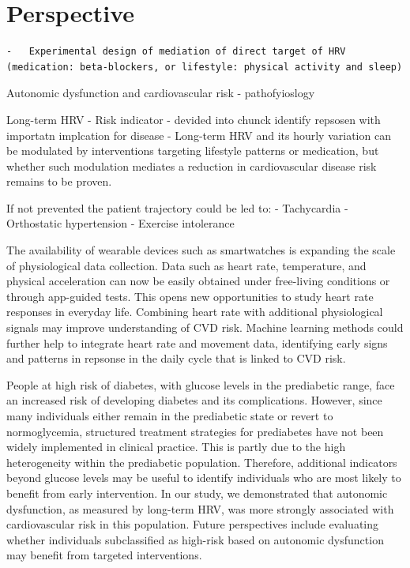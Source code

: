 \documentclass[
  a4paper,
  headsepline=true,
  open=any]{scrbook}
\begin{document}
\hypertarget{perspective}{%
\chapter{Perspective}\label{perspective}}

\begin{verbatim}
-   Experimental design of mediation of direct target of HRV (medication: beta-blockers, or lifestyle: physical activity and sleep)
\end{verbatim}

Autonomic dysfunction and cardiovascular risk - pathofyioslogy

Long-term HRV - Risk indicator - devided into chunck identify repsosen
with importatn implcation for disease - Long-term HRV and its hourly
variation can be modulated by interventions targeting lifestyle patterns
or medication, but whether such modulation mediates a reduction in
cardiovascular disease risk remains to be proven.

If not prevented the patient trajectory could be led to: - Tachycardia -
Orthostatic hypertension - Exercise intolerance

The availability of wearable devices such as smartwatches is expanding
the scale of physiological data collection. Data such as heart rate,
temperature, and physical acceleration can now be easily obtained under
free-living conditions or through app-guided tests. This opens new
opportunities to study heart rate responses in everyday life. Combining
heart rate with additional physiological signals may improve
understanding of CVD risk. Machine learning methods could further help
to integrate heart rate and movement data, identifying early signs and
patterns in repsonse in the daily cycle that is linked to CVD risk.

People at high risk of diabetes, with glucose levels in the prediabetic
range, face an increased risk of developing diabetes and its
complications. However, since many individuals either remain in the
prediabetic state or revert to normoglycemia, structured treatment
strategies for prediabetes have not been widely implemented in clinical
practice. This is partly due to the high heterogeneity within the
prediabetic population. Therefore, additional indicators beyond glucose
levels may be useful to identify individuals who are most likely to
benefit from early intervention. In our study, we demonstrated that
autonomic dysfunction, as measured by long-term HRV, was more strongly
associated with cardiovascular risk in this population. Future
perspectives include evaluating whether individuals subclassified as
high-risk based on autonomic dysfunction may benefit from targeted
interventions.
\end{document}
